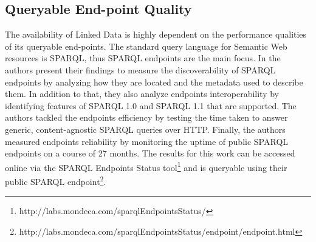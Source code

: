 \documentclass[onecolumn, crcready]{iosart2c}
\begin{document}
\subsection{Queryable End-point Quality}
The availability of Linked Data is highly dependent on the performance qualities of its queryable end-points. The standard query language for Semantic Web resources is SPARQL, thus SPARQL endpoints are the main focus. In \cite{Buil-Aranda2013} the authors present their findings to measure the discoverability of SPARQL endpoints by analyzing how they are located and the metadata used to describe them. In addition to that, they also analyze endpoints interoperability by identifying features of SPARQL 1.0 and SPARQL 1.1 that are supported. The authors tackled the endpoints efficiency by testing the time taken to answer generic, content-agnostic SPARQL queries over HTTP. Finally, the authors measured endpoints reliability by monitoring the uptime of public SPARQL endpoints on a course of 27 months. The results for this work can be accessed online via the SPARQL Endpoints Status tool\footnote{http://labs.mondeca.com/sparqlEndpointsStatus/} and is queryable using their public SPARQL endpoint\footnote{http://labs.mondeca.com/sparqlEndpointsStatus/endpoint/endpoint.html}.\\
\end{document}
